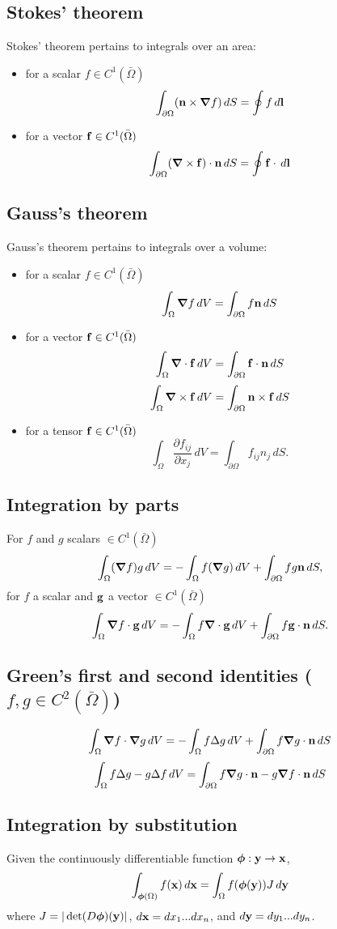 \documentclass[oneside,a4paper,11pt]{report}
\begin{document}
\subsection{Stokes' theorem}
Stokes' theorem pertains to integrals over an area:
\begin{itemize}
\item for a scalar $f \in C^1 (\bar{\Omega})$
\[\int_{\partial \Omega} (\mathbf{n} \times \boldsymbol \nabla f)\,dS = \oint f \, d\mathbf{l} \]
\item for a vector $\mathbf{f} \in C^1 (\bar{\Omega})$
\[\int_{\partial \Omega} (\boldsymbol \nabla \times \mathbf{f}) \cdot \mathbf{n} \,dS = \oint \mathbf{f} \cdot \, d\mathbf{l} \]
\end{itemize}

\subsection{Gauss's theorem}
Gauss's theorem pertains to integrals over a volume:
\begin{itemize}
\item for a scalar $f \in C^1 (\bar{\Omega})$
\[\int_{\Omega} \boldsymbol \nabla f\,dV=\int_{\partial \Omega} f \mathbf{n} \,dS\] 
\item for a vector $\mathbf{f} \in C^1 (\bar{\Omega})$
\[\int_{\Omega} \boldsymbol \nabla \cdot \mathbf{f} \,dV=\int_{\partial \Omega} \mathbf{f} \cdot \mathbf{n} \,dS \] 
\[\int_{\Omega} \boldsymbol \nabla \times \mathbf{f}\,dV=\int_{\partial \Omega} \mathbf{n} \times \mathbf{f} \,dS \]
\item for a tensor $\mathbf{f} \in C^1 (\bar{\Omega})$
\[\int_{\Omega} \frac{\partial f_{ij}}{\partial x_j}\,dV=\int_{\partial \Omega} f_{ij}n_j\,dS. \]
\end{itemize}

\subsection{Integration by parts}
For $f$ and $g$ scalars $\in C^1(\bar{\Omega})$
\[\int_{\Omega} (\boldsymbol \nabla f)g \,dV = - \int_{\Omega} f (\boldsymbol \nabla g) \,dV + \int_{\partial \Omega} fg \mathbf{n} \,dS,\]
for $f$ a scalar and $\mathbf{g}$ a vector $\in C^1(\bar{\Omega})$
\[\int_{\Omega} \boldsymbol \nabla f \cdot \mathbf{g} \,dV = - \int_{\Omega} f \boldsymbol \nabla \cdot \mathbf{g} \,dV + \int_{\partial \Omega} f \mathbf{g} \cdot \mathbf{n} \,dS.\]

\subsection{Green's first and second identities ($f,g \in C^2(\bar{\Omega})$)}
\[\int_{\Omega} \boldsymbol \nabla f \cdot \boldsymbol \nabla g \,dV = -\int_{\Omega} f \Delta g \,dV + \int_{\partial \Omega} f \boldsymbol \nabla g \cdot \mathbf{n} \,dS\]
\[\int_{\Omega} f \Delta g - g \Delta f \,dV = \int_{\partial \Omega} f \boldsymbol \nabla g \cdot \mathbf{n} - g \boldsymbol \nabla f \cdot \mathbf{n} \, dS\] 

\subsection{Integration by substitution}
Given the continuously differentiable function $\boldsymbol\phi: \mathbf{y} \to \mathbf{x}$,
\[\int_{\boldsymbol\phi(\Omega)}f(\mathbf{x}) \, d\mathbf{x} = \int_{\Omega} f(\boldsymbol\phi(\mathbf{y})) J \,d\mathbf{y}\]
where $J = |\det (D\boldsymbol\phi)(\mathbf{y})|$, $d\mathbf{x} = dx_1...dx_n$, and $d\mathbf{y} = dy_1...dy_n$.
\end{document}
